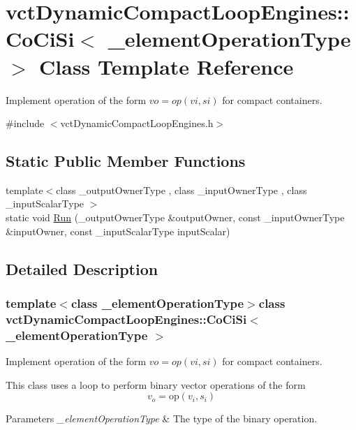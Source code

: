 \hypertarget{classvct_dynamic_compact_loop_engines_1_1_co_ci_si}{\section{vct\-Dynamic\-Compact\-Loop\-Engines\-:\-:Co\-Ci\-Si$<$ \-\_\-element\-Operation\-Type $>$ Class Template Reference}
\label{classvct_dynamic_compact_loop_engines_1_1_co_ci_si}
}


Implement operation of the form $vo = op(vi, si)$ for compact containers.  




{\ttfamily \#include $<$vct\-Dynamic\-Compact\-Loop\-Engines.\-h$>$}

\subsection*{Static Public Member Functions}
\begin{DoxyCompactItemize}
\item 
{\footnotesize template$<$class \-\_\-output\-Owner\-Type , class \-\_\-input\-Owner\-Type , class \-\_\-input\-Scalar\-Type $>$ }\\static void \hyperlink{classvct_dynamic_compact_loop_engines_1_1_co_ci_si_a41d4466ae16598c2e973382b2e2df69e}{Run} (\-\_\-output\-Owner\-Type \&output\-Owner, const \-\_\-input\-Owner\-Type \&input\-Owner, const \-\_\-input\-Scalar\-Type input\-Scalar)
\end{DoxyCompactItemize}


\subsection{Detailed Description}
\subsubsection*{template$<$class \-\_\-element\-Operation\-Type$>$class vct\-Dynamic\-Compact\-Loop\-Engines\-::\-Co\-Ci\-Si$<$ \-\_\-element\-Operation\-Type $>$}

Implement operation of the form $vo = op(vi, si)$ for compact containers. 

This class uses a loop to perform binary vector operations of the form \[ v_o = \mathrm{op}(v_i, s_i) \]


\begin{DoxyParams}{Parameters}
{\em \-\_\-element\-Operation\-Type} & The type of the binary operation. \\
\hline
\end{DoxyParams}


